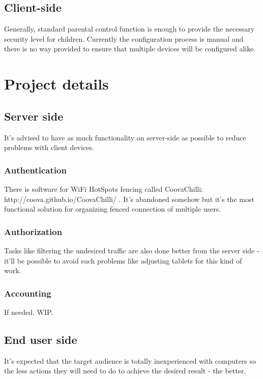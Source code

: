 \documentclass[a4paper, sans, booktabs, totpages, english]{report}
\begin{document}
\chapter{Client-side}

Generally, standard parental control function is enough to provide the
necessary security level for children. Currently the configuration
process is manual and there is no way provided to ensure that multiple
devices will be configured alike.


\part{Project details}

\chapter{Server side}

It's advised to have as much functionality on server-side as possible
to reduce problems with client devices.


\section{Authentication}

There is software for WiFi HotSpots fencing called CoovaChilli:
http://coova.github.io/CoovaChilli/ . It's abandoned somehow but it's
the most functional solution for organizing fenced connection of
multiple users.


\section{Authorization}

Tasks like filtering the undesired traffic are also done better from
the server side - it'll be possible to avoid such problems like
adjusting tablets for this kind of work.


\section{Accounting}

If needed. WIP.


\chapter{End user side}

It's expected that the target audience is totally inexperienced with
computers so the less actions they will need to do to achieve the
desired result - the better.
\end{document}
